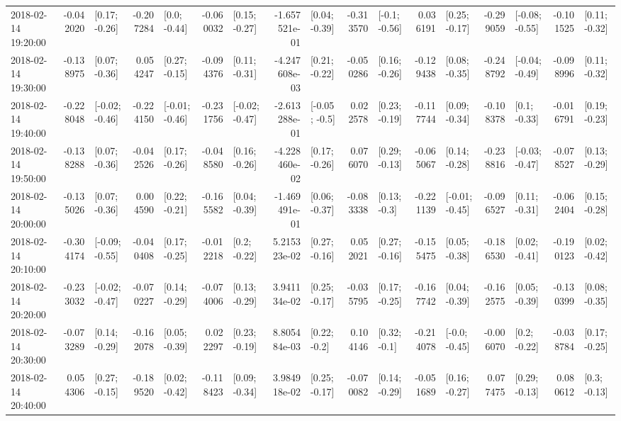 \begin{tabular}{lrlrlrlrlrlrlrlrl}
2018-02-14 19:20:00 & -0.042020 &   [0.17; -0.26] & -0.207284 &    [0.0; -0.44] & -0.060032 &   [0.15; -0.27] & -1.657521e-01 &   [0.04; -0.39] & -0.313570 &   [-0.1; -0.56] &  0.036191 &   [0.25; -0.17] & -0.299059 &  [-0.08; -0.55] & -0.101525 &   [0.11; -0.32] \\
2018-02-14 19:30:00 & -0.138975 &   [0.07; -0.36] &  0.054247 &   [0.27; -0.15] & -0.094376 &   [0.11; -0.31] & -4.247608e-03 &   [0.21; -0.22] & -0.050286 &   [0.16; -0.26] & -0.129438 &   [0.08; -0.35] & -0.248792 &  [-0.04; -0.49] & -0.098996 &   [0.11; -0.32] \\
2018-02-14 19:40:00 & -0.228048 &  [-0.02; -0.46] & -0.224150 &  [-0.01; -0.46] & -0.231756 &  [-0.02; -0.47] & -2.613288e-01 &   [-0.05; -0.5] &  0.022578 &   [0.23; -0.19] & -0.117744 &   [0.09; -0.34] & -0.108378 &    [0.1; -0.33] & -0.016791 &   [0.19; -0.23] \\
2018-02-14 19:50:00 & -0.138288 &   [0.07; -0.36] & -0.042526 &   [0.17; -0.26] & -0.048580 &   [0.16; -0.26] & -4.228460e-02 &   [0.17; -0.26] &  0.076070 &   [0.29; -0.13] & -0.065067 &   [0.14; -0.28] & -0.238816 &  [-0.03; -0.47] & -0.078527 &   [0.13; -0.29] \\
2018-02-14 20:00:00 & -0.135026 &   [0.07; -0.36] &  0.004590 &   [0.22; -0.21] & -0.165582 &   [0.04; -0.39] & -1.469491e-01 &   [0.06; -0.37] & -0.083338 &    [0.13; -0.3] & -0.221139 &  [-0.01; -0.45] & -0.096527 &   [0.11; -0.31] & -0.062404 &   [0.15; -0.28] \\
2018-02-14 20:10:00 & -0.304174 &  [-0.09; -0.55] & -0.040408 &   [0.17; -0.25] & -0.012218 &    [0.2; -0.22] &  5.215323e-02 &   [0.27; -0.16] &  0.052021 &   [0.27; -0.16] & -0.155475 &   [0.05; -0.38] & -0.186530 &   [0.02; -0.41] & -0.190123 &   [0.02; -0.42] \\
2018-02-14 20:20:00 & -0.233032 &  [-0.02; -0.47] & -0.070227 &   [0.14; -0.29] & -0.074006 &   [0.13; -0.29] &  3.941134e-02 &   [0.25; -0.17] & -0.035795 &   [0.17; -0.25] & -0.167742 &   [0.04; -0.39] & -0.162575 &   [0.05; -0.39] & -0.130399 &   [0.08; -0.35] \\
2018-02-14 20:30:00 & -0.073289 &   [0.14; -0.29] & -0.162078 &   [0.05; -0.39] &  0.022297 &   [0.23; -0.19] &  8.805484e-03 &    [0.22; -0.2] &  0.104146 &    [0.32; -0.1] & -0.214078 &   [-0.0; -0.45] & -0.006070 &    [0.2; -0.22] & -0.038784 &   [0.17; -0.25] \\
2018-02-14 20:40:00 &  0.054306 &   [0.27; -0.15] & -0.189520 &   [0.02; -0.42] & -0.118423 &   [0.09; -0.34] &  3.984918e-02 &   [0.25; -0.17] & -0.070082 &   [0.14; -0.29] & -0.051689 &   [0.16; -0.27] &  0.077475 &   [0.29; -0.13] &  0.080612 &    [0.3; -0.13] \\

\end{tabular}
